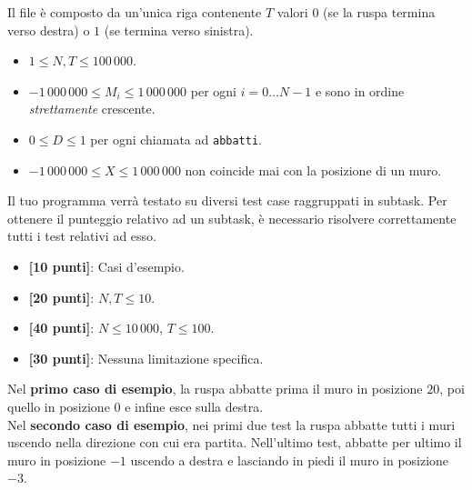 \OutputFile
Il file \outputfile{} è composto da un'unica riga contenente $T$ valori $0$ (se la ruspa termina verso destra) o $1$ (se termina verso sinistra).

\Constraints
\begin{itemize}[nolistsep, itemsep=2mm]
	\item $1 \le N, T \le 100\,000$.
	\item $-1\,000\,000 \le M_i \le 1\,000\,000$ per ogni $i=0\ldots N-1$ e sono in ordine \emph{strettamente} crescente.
	\item $0 \le D \le 1$ per ogni chiamata ad \texttt{abbatti}.
	\item $-1\,000\,000 \le X \le 1\,000\,000$ non coincide mai con la posizione di un muro.
\end{itemize}

\Scoring
Il tuo programma verrà testato su diversi test case raggruppati in subtask.
Per ottenere il punteggio relativo ad un subtask, è necessario risolvere
correttamente tutti i test relativi ad esso.

\begin{itemize}[nolistsep,itemsep=2mm]
  \item \textbf{ [10 punti]}: Casi d'esempio.
  \item \textbf{ [20 punti]}: $N, T \leq 10$.
  \item \textbf{ [40 punti]}: $N \leq 10\,000$, $T \leq 100$.
  \item \textbf{ [30 punti]}: Nessuna limitazione specifica.
\end{itemize}



\Examples
\begin{example}
%
%
\end{example}

\pagebreak

\Explanation
Nel \textbf{primo caso di esempio}, la ruspa abbatte prima il muro in posizione $20$, poi quello in posizione $0$ e infine esce sulla destra.\\[2mm]
Nel \textbf{secondo caso di esempio}, nei primi due test la ruspa abbatte tutti i muri uscendo nella direzione con cui era partita. Nell'ultimo test, abbatte per ultimo il muro in posizione $-1$ uscendo a destra e lasciando in piedi il muro in posizione $-3$.
